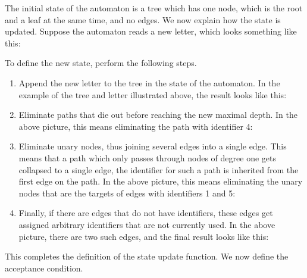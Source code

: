 The initial state of the automaton is a tree which has one node, which is the root and a leaf at the same time, and no edges. We now explain how the state is updated. Suppose the automaton reads a new letter, which looks something like this:


To define the new state, perform the following  steps.

\begin{enumerate}
	\item Append the new letter to the tree in the state of the automaton. In the example of the tree and letter illustrated above, the result looks like this:
\item Eliminate paths that  die out before reaching the new maximal depth. In the above picture, this means eliminating the path with identifier 4:
\item Eliminate unary nodes, thus joining several edges into a single edge. This means that a path which only passes through nodes of degree one gets collapsed to a single edge, the identifier for such a path is inherited from the first edge on the path. In the above picture, this means eliminating the unary nodes that are the targets of edges with identifiers 1 and 5:
\item Finally, if there are edges that do not have identifiers, these edges get assigned arbitrary identifiers that are not currently used. In the above picture, there are two such edges, and the final result looks like this:
\end{enumerate}


This completes the definition of the state update function. We now define the acceptance condition.


